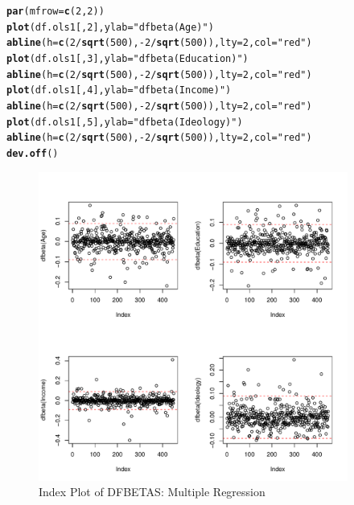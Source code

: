 \documentclass[11pt,openany]{book}\usepackage[]{graphicx}\usepackage[]{color}
\makeatletter
\newcommand{\hlnum}[1]{\textcolor[rgb]{0.686,0.059,0.569}{#1}}%
\newcommand{\hlstr}[1]{\textcolor[rgb]{0.192,0.494,0.8}{#1}}%
\newcommand{\hlopt}[1]{\textcolor[rgb]{0,0,0}{#1}}%
\newcommand{\hlstd}[1]{\textcolor[rgb]{0.345,0.345,0.345}{#1}}%
\newcommand{\hlkwc}[1]{\textcolor[rgb]{0.333,0.667,0.333}{#1}}%
\newcommand{\hlkwd}[1]{\textcolor[rgb]{0.737,0.353,0.396}{\textbf{#1}}}%
\newenvironment{kframe}{%
 \def\at@end@of@kframe{}%
 \ifinner\ifhmode%
  \def\at@end@of@kframe{\end{minipage}}%
  \begin{minipage}{\columnwidth}%
 \fi\fi%
 \def\FrameCommand##1{\hskip\@totalleftmargin \hskip-\fboxsep
 \colorbox{shadecolor}{##1}\hskip-\fboxsep
     \hskip-\linewidth \hskip-\@totalleftmargin \hskip\columnwidth}%
 \MakeFramed {\advance\hsize-\width
   \@totalleftmargin\z@ \linewidth\hsize
   \@setminipage}}%
 {\par\unskip\endMakeFramed%
 \at@end@of@kframe}
\newenvironment{knitrout}{}{} %
\renewenvironment{knitrout}{\begin{singlespace}}{\end{singlespace}} %
\makeatother
\begin{document}
\begin{knitrout}
\color{fgcolor}\begin{kframe}
\begin{alltt}
\hlkwd{par}\hlstd{(}\hlkwc{mfrow} \hlstd{=} \hlkwd{c}\hlstd{(}\hlnum{2}\hlstd{,} \hlnum{2}\hlstd{))}
\hlkwd{plot}\hlstd{(df.ols1[,} \hlnum{2}\hlstd{],} \hlkwc{ylab} \hlstd{=} \hlstr{"dfbeta(Age)"}\hlstd{)}
\hlkwd{abline}\hlstd{(}\hlkwc{h} \hlstd{=} \hlkwd{c}\hlstd{(}\hlnum{2}\hlopt{/}\hlkwd{sqrt}\hlstd{(}\hlnum{500}\hlstd{),} \hlopt{-}\hlnum{2}\hlopt{/}\hlkwd{sqrt}\hlstd{(}\hlnum{500}\hlstd{)),} \hlkwc{lty} \hlstd{=} \hlnum{2}\hlstd{,} \hlkwc{col} \hlstd{=} \hlstr{"red"}\hlstd{)}
\hlkwd{plot}\hlstd{(df.ols1[,} \hlnum{3}\hlstd{],} \hlkwc{ylab} \hlstd{=} \hlstr{"dfbeta(Education)"}\hlstd{)}
\hlkwd{abline}\hlstd{(}\hlkwc{h} \hlstd{=} \hlkwd{c}\hlstd{(}\hlnum{2}\hlopt{/}\hlkwd{sqrt}\hlstd{(}\hlnum{500}\hlstd{),} \hlopt{-}\hlnum{2}\hlopt{/}\hlkwd{sqrt}\hlstd{(}\hlnum{500}\hlstd{)),} \hlkwc{lty} \hlstd{=} \hlnum{2}\hlstd{,} \hlkwc{col} \hlstd{=} \hlstr{"red"}\hlstd{)}
\hlkwd{plot}\hlstd{(df.ols1[,} \hlnum{4}\hlstd{],} \hlkwc{ylab} \hlstd{=} \hlstr{"dfbeta(Income)"}\hlstd{)}
\hlkwd{abline}\hlstd{(}\hlkwc{h} \hlstd{=} \hlkwd{c}\hlstd{(}\hlnum{2}\hlopt{/}\hlkwd{sqrt}\hlstd{(}\hlnum{500}\hlstd{),} \hlopt{-}\hlnum{2}\hlopt{/}\hlkwd{sqrt}\hlstd{(}\hlnum{500}\hlstd{)),} \hlkwc{lty} \hlstd{=} \hlnum{2}\hlstd{,} \hlkwc{col} \hlstd{=} \hlstr{"red"}\hlstd{)}
\hlkwd{plot}\hlstd{(df.ols1[,} \hlnum{5}\hlstd{],} \hlkwc{ylab} \hlstd{=} \hlstr{"dfbeta(Ideology)"}\hlstd{)}
\hlkwd{abline}\hlstd{(}\hlkwc{h} \hlstd{=} \hlkwd{c}\hlstd{(}\hlnum{2}\hlopt{/}\hlkwd{sqrt}\hlstd{(}\hlnum{500}\hlstd{),} \hlopt{-}\hlnum{2}\hlopt{/}\hlkwd{sqrt}\hlstd{(}\hlnum{500}\hlstd{)),} \hlkwc{lty} \hlstd{=} \hlnum{2}\hlstd{,} \hlkwc{col} \hlstd{=} \hlstr{"red"}\hlstd{)}
\hlkwd{dev.off}\hlstd{()}
\end{alltt}
\end{kframe}
\end{knitrout}

\begin{figure}
        \centering
        \includegraphics[width=4in]{15_Diagnostics/dfbetas.pdf}%
        \caption{Index Plot of DFBETAS: Multiple  Regression \label{fig:dfbetas}}
\end{figure}        
\end{document}
